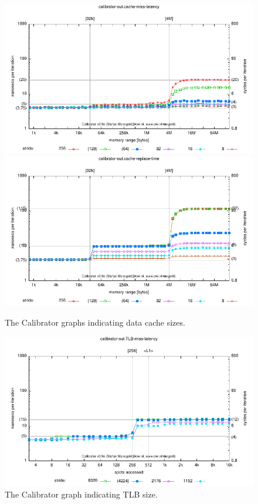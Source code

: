 \documentclass[11 pt]{article}
\begin{document}
\begin{figure}[!h]
  \centering
	\includegraphics[type=pdf,ext=.pdf,read=.pdf,width=\columnwidth]{../system_info/calibrator-out.cache-miss-latency}
	\includegraphics[type=pdf,ext=.pdf,read=.pdf,width=\columnwidth]{../system_info/calibrator-out.cache-replace-time}
  \caption{The Calibrator graphs indicating data cache sizes.}
  \label{fig:calibrator_cache}
\end{figure}

\begin{figure}[!h]
  \centering
	\includegraphics[type=pdf,ext=.pdf,read=.pdf,width=\columnwidth]{../system_info/calibrator-out.TLB-miss-latency}
  \caption{The Calibrator graph indicating TLB size.}
  \label{fig:calibrator_tlb}
\end{figure}
\end{document}

